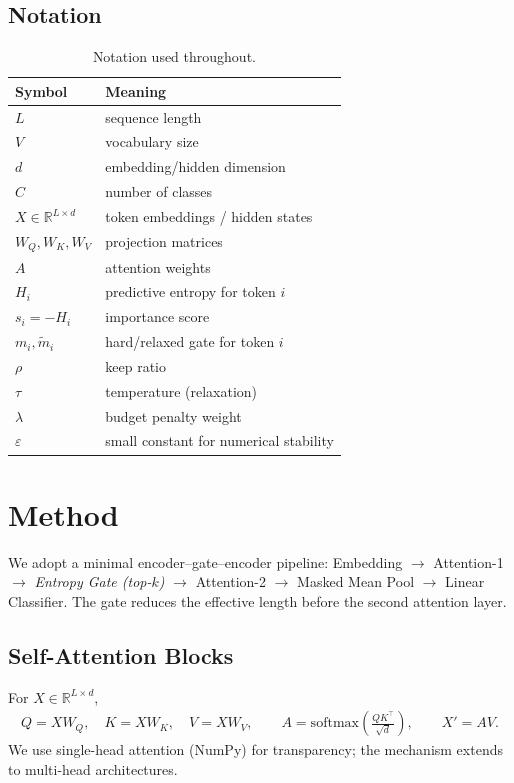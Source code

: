 \documentclass{article}
\newcommand{\Lseq}{L}
\newcommand{\dmodel}{d}
\begin{document}
\subsection*{Notation}
\begin{table}[htbp]
\centering
\begin{tabular}{ll}
\toprule
Symbol & Meaning \\
\midrule
$L$ & sequence length \\
$V$ & vocabulary size \\
$d$ & embedding/hidden dimension \\
$C$ & number of classes \\
$X \in \mathbb{R}^{L\times d}$ & token embeddings / hidden states \\
$W_Q,W_K,W_V$ & projection matrices \\
$A$ & attention weights \\
$H_i$ & predictive entropy for token $i$ \\
$s_i=-H_i$ & importance score \\
$m_i,\tilde m_i$ & hard/relaxed gate for token $i$ \\
$\rho$ & keep ratio \\
$\tau$ & temperature (relaxation) \\
$\lambda$ & budget penalty weight \\
$\varepsilon$ & small constant for numerical stability \\
\bottomrule
\end{tabular}
\caption{Notation used throughout.}
\end{table}

\section{Method}
\label{sec:method}
We adopt a minimal encoder--gate--encoder pipeline: Embedding $\rightarrow$ Attention-1 $\rightarrow$ \emph{Entropy Gate (top-$k$)} $\rightarrow$ Attention-2 $\rightarrow$ Masked Mean Pool $\rightarrow$ Linear Classifier. The gate reduces the effective length before the second attention layer.

\subsection{Self-Attention Blocks}
For $X\in\mathbb{R}^{\Lseq\times\dmodel}$,
\begin{align}
Q = X W_Q,\quad K = X W_K,\quad V = X W_V,\qquad
A = \mathrm{softmax}\!\left(\frac{QK^\top}{\sqrt{\dmodel}}\right),\qquad X' = AV.
\end{align}
We use single-head attention (NumPy) for transparency; the mechanism extends to multi-head architectures.
\end{document}
